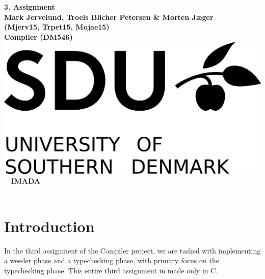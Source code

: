\documentclass[a4paper,10pt,titlepage]{report}
\begin{document}
\begin{titlepage}
\centering
    \vspace*{9\baselineskip}
    \huge
    \bfseries
    3. Assignment \\
    \normalfont 
    Mark Jervelund, Troels Blicher Petersen \& Morten Jæger  \\
    (Mjerv15, Trpet15, Mojae15) \\
	\huge    
    Compiler (DM546)  \\[4\baselineskip]
    \normalfont
	\includegraphics[scale=1]{../img/SDU_logo}
    \vfill\ 
    \vspace{5mm}
    IMADA \\

    \textbf{\datedate} \\[2\baselineskip]
\end{titlepage}

\renewcommand{\thepage}{\roman{page}}%
\tableofcontents
\newpage
\setcounter{page}{1}
\renewcommand{\thepage}{\arabic{page}}
\newpage

\section{Introduction}
In the third assignment of the Compiler project, we are tasked with implementing a weeder phase and a typechecking phase, with primary focus on the typechecking phase. This entire third assignment in made only in C.
\end{document}

